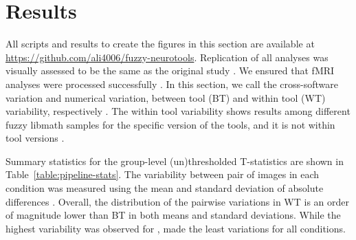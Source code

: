 \documentclass[conference]{IEEEtran}
\begin{document}
\section{Results}
All scripts and results to create the figures in this section are available at \url{https://github.com/ali4006/fuzzy-neurotools}.
Replication of all analyses was visually assessed  to be the same as the original study .
We ensured that fMRI analyses were processed successfully .
In this section, we call the cross-software variation and numerical variation,
between tool (BT) and within tool (WT) variability, respectively . 
The within tool variability shows results among different fuzzy libmath 
samples for the specific version of the tools, and it is not within tool versions .

Summary statistics for the group-level (un)thresholded T-statistics are shown in
Table~\ref{table:pipeline-stats}.
The variability between pair of images  in each condition was measured using the mean and standard deviation of absolute differences .
Overall, the distribution of the pairwise variations in WT is an order of magnitude lower than BT in both means and standard deviations.
While the highest variability was observed for \fslafni, \fslspm made the least variations for all conditions.
\end{document}
